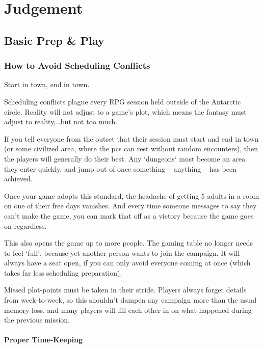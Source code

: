 \chapter{Judgement}

\section{Basic Prep \& Play}

\begin{multicols}{2}

\subsection{How to Avoid Scheduling Conflicts}

Start in town, end in town.

Scheduling conflicts plague every RPG session held outside of the Antarctic circle.
Reality will not adjust to a game's plot, which means the fantasy must adjust to reality,\ldots but not too much.

If you tell everyone from the outset that their session must start and end in town (or some civilized area, where the \glspl{pc} can rest without random encounters), then the players will generally do their best.
Any `dungeons` must become an area they enter quickly, and jump out of once something -- anything -- has been achieved.

Once your game adopts this standard, the headache of getting 5 adults in a room on one of their free days vanishes.
And every time someone messages to say they can't make the game, you can mark that off as a victory because the game goes on regardless.

This also opens the game up to more people.
The gaming table no longer needs to feel `full', because yet another person wants to join the campaign.
It will always have a seat open, if you can only avoid everyone coming at once (which takes far less scheduling preparation).

Missed plot-points must be taken in their stride.
Players always forget details from week-to-week, so this shouldn't dampen any campaign more than the usual memory-loss, and many players will fill each other in on what happened during the previous mission.

\subsubsection{Proper Time-Keeping}


\end{multicols}
